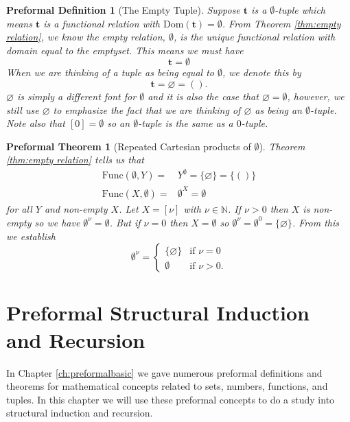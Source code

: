 \documentclass[oneside, 12pt]{book}
\theoremstyle{break}
\newtheorem{preformal definition}[definition]{Preformal Definition}
\newtheorem{preformal theorem}[theorem]{Preformal Theorem}
\newcommand{\bv}[1]{\boldsymbol{#1}}
\newcommand{\N}[0]{\mathbb{N}}
\begin{document}
				\begin{preformal definition}[The Empty Tuple]
					Suppose $\bv{t}$ is a $\emptyset$-tuple which means $\bv{t}$ is a functional relation with $\text{Dom}(\bv{t}) = \emptyset$.
					From Theorem \ref{thm:empty relation}, we know the empty relation, $\emptyset$, is the unique functional relation with domain equal to the emptyset.
					This means we must have 
					\begin{equation*}
						\bv{t} = \emptyset
					\end{equation*}
					When we are thinking of a tuple as being equal to $\emptyset$, we denote this by
					\begin{equation*}
						\bv{t} = \varnothing = ().
					\end{equation*}
					$\varnothing$ is simply a different font for $\emptyset$ and it is also the case that $\varnothing = \emptyset$, however, we still use $\varnothing$ to emphasize the fact that we are thinking of $\varnothing$ as being an $\emptyset$-tuple.
					Note also that $[0] = \emptyset$ so an $\emptyset$-tuple is the same as a $0$-tuple.
				\end{preformal definition}
	
				\begin{preformal theorem}[Repeated Cartesian products of $\emptyset$]
					\label{thm:repeated cartesian products of emptyset}
					Theorem \ref{thm:empty relation} tells us that
					\begin{align*}
						\text{Func}(\emptyset, Y) =& Y^{\emptyset} = \{\varnothing\} = \{()\}\\
						\text{Func}(X, \emptyset) =& \emptyset^X = \emptyset
					\end{align*}
					for all $Y$ and non-empty $X$.
					Let $X=[\nu]$ with $\nu \in \N$.
					If $\nu > 0$ then $X$ is non-empty so we have $\emptyset^{\nu} = \emptyset$.
					But if $\nu=0$ then $X = \emptyset$ so $\emptyset^{\nu} = \emptyset^0 = \{\varnothing\}$.
					From this we establish
					\begin{equation*}
						\emptyset^{\nu} = \begin{cases}
							\{\varnothing\} &\text{if } \nu=0\\
							\emptyset & \text{if } \nu > 0.
						\end{cases}
					\end{equation*}
				\end{preformal theorem}	
	
	\chapter{Preformal Structural Induction and Recursion}
	\label{ch:preformalinduction}
		In Chapter \ref{ch:preformalbasic} we gave numerous preformal definitions and theorems for mathematical concepts related to sets, numbers, functions, and tuples.
		In this chapter we will use these preformal concepts to do a study into structural induction and recursion.
		
\end{document}
